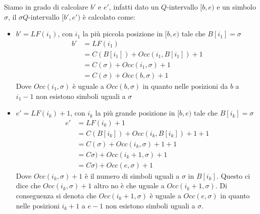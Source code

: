 Siamo in grado di calcolare $b'$ e $e'$, infatti dato un $Q$-intervallo $[b,e)$ e un simbolo $\sigma$, il $\sigma Q$-intervallo $[b',e')$ è calcolato come:
\begin{itemize}
    \item $b' = LF(i_1)$, con $i_1$ la più piccola posizione in $[b,e)$ tale che $B[i_1] =\sigma$ 
    \begin{equation*}
        \begin{split}
           b' & =  LF(i_1) \\
           & = C(B[i_1]) + Occ(i_1, B[i_1]) + 1\\
           & = C(\sigma) + Occ(i_1, \sigma) + 1 \\
           & = C(\sigma) + Occ(b, \sigma) + 1
        \end{split}
    \end{equation*}
    Dove $Occ(i_1, \sigma)$ è uguale a $Occ(b, \sigma)$ in quanto nelle posizioni da $b$ a $i_1 - 1$ non esistono simboli uguali a $\sigma$
    \item $e' = LF(i_k) + 1$, con $i_k$ la più grande posizione in $[b,e)$ tale che $B[i_k] =\sigma$
    \begin{equation*}
        \begin{split}
           e' & = LF(i_k) +1 \\
           & = C(B[i_k]) + Occ(i_k, B[i_k]) + 1 + 1 \\
           & = C(\sigma) + Occ(i_k, \sigma) + 1 + 1 \\
           & = C\sigma) + Occ(i_k + 1 ,\sigma) + 1 \\
           & = C\sigma) + Occ(e ,\sigma) + 1
        \end{split}
    \end{equation*}
     Dove $Occ(i_k, \sigma) + 1$ è il numero di simboli uguali a $\sigma$ in $B[i_k]$. Questo ci dice che $Occ(i_k, \sigma) + 1$ altro no è che uguale a $Occ(i_k + 1, \sigma)$. Di conseguenza si denota che $Occ(i_k + 1, \sigma)$ è uguale a $Occ(e,\sigma)$ in quanto nelle posizioni $i_k + 1$ a $e-1$ non esistono simboli uguali a $\sigma$.
\end{itemize}

